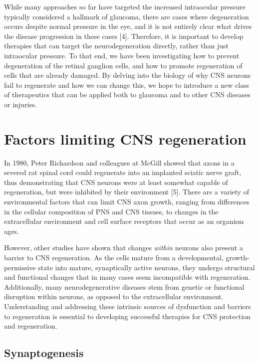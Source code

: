 \documentclass[
  12pt,
  a4paper,
]{book}
\begin{document}
While many approaches so far have targeted the increased intraocular pressure typically considered a hallmark of glaucoma, there are cases where degeneration occurs despite normal pressure in the eye, and it is not entirely clear what drives the disease progression in these cases {[}4{]}. Therefore, it is important to develop therapies that can target the neurodegeneration directly, rather than just intraocular pressure. To that end, we have been investigating how to prevent degeneration of the retinal ganglion cells, and how to promote regeneration of cells that are already damaged. By delving into the biology of why CNS neurons fail to regenerate and how we can change this, we hope to introduce a new class of therapeutics that can be applied both to glaucoma and to other CNS diseases or injuries.

\hypertarget{factors-limiting-cns-regeneration}{%
\section{Factors limiting CNS regeneration}\label{factors-limiting-cns-regeneration}}

In 1980, Peter Richardson and colleagues at McGill showed that axons in a severed rat spinal cord could regenerate into an implanted sciatic nerve graft, thus demonstrating that CNS neurons were at least somewhat capable of regeneration, but were inhibited by their environment {[}5{]}. There are a variety of environmental factors that can limit CNS axon growth, ranging from differences in the cellular composition of PNS and CNS tissues, to changes in the extracellular environment and cell surface receptors that occur as an organism ages.

However, other studies have shown that changes \emph{within} neurons also present a barrier to CNS regeneration. As the cells mature from a developmental, growth-permissive state into mature, synaptically active neurons, they undergo structural and functional changes that in many cases seem incompatible with regeneration. Additionally, many neurodegenerative diseases stem from genetic or functional disruption within neurons, as opposed to the extracellular environment. Understanding and addressing these intrinsic sources of dysfunction and barriers to regeneration is essential to developing successful therapies for CNS protection and regeneration.

\hypertarget{synaptogenesis}{%
\subsection{Synaptogenesis}\label{synaptogenesis}}
\end{document}
